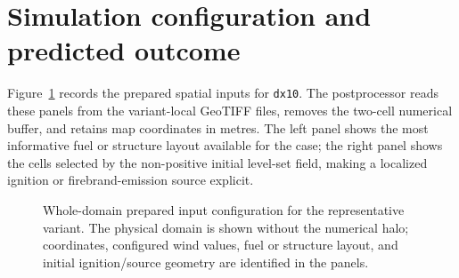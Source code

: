 \section{Simulation configuration and predicted outcome}

Figure~\ref{fig:input-configuration} records the prepared spatial inputs for \texttt{dx10}.
The postprocessor reads these panels from the variant-local GeoTIFF files, removes the
two-cell numerical buffer, and retains map coordinates in metres.  The left panel shows
the most informative fuel or structure layout available for the case; the right panel
shows the cells selected by the non-positive initial level-set field, making a localized
ignition or firebrand-emission source explicit.

\begin{figure}[H]
\centering
{}
\caption{Whole-domain prepared input configuration for the representative variant.  The
physical domain is shown without the numerical halo; coordinates, configured wind values,
fuel or structure layout, and initial ignition/source geometry are identified in the panels.}
\label{fig:input-configuration}
\end{figure}


